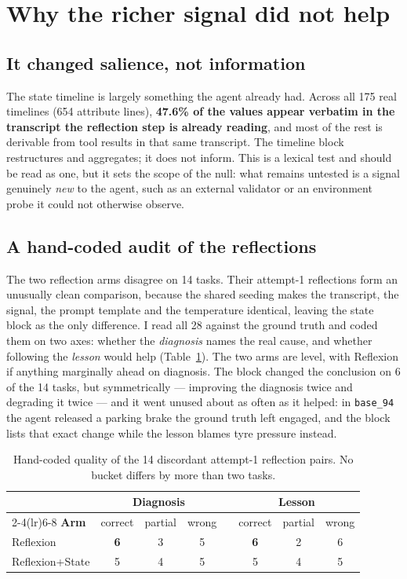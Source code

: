 \documentclass[a4paper, 12pt]{article}
\begin{document}
\section{Why the richer signal did not help}
\label{sec:why}

\subsection{It changed salience, not information}

The state timeline is largely something the agent already had. Across all 175 real
timelines (654 attribute lines), \textbf{47.6\% of the values appear verbatim in
the transcript the reflection step is already reading}, and most of the rest is
derivable from tool results in that same transcript. The timeline block restructures and
aggregates; it does not inform. This is a lexical test and should be read as
one, but it sets the scope of the null: what remains untested is a signal
genuinely \emph{new} to the agent, such as an external validator or an
environment probe it could not otherwise observe.

\subsection{A hand-coded audit of the reflections}

The two reflection arms disagree on 14 tasks. Their attempt-1 reflections form
an unusually clean comparison, because the shared seeding makes the transcript,
the signal, the prompt template and the temperature identical, leaving the state
block as the only difference. I read all 28 against the ground truth and coded
them on two axes: whether the \emph{diagnosis} names the real cause, and
whether following the \emph{lesson} would help (Table~\ref{tab:audit}).
The two arms are level, with Reflexion if anything marginally ahead on diagnosis.
The block changed the conclusion on 6 of the 14 tasks, but symmetrically ---
improving the diagnosis twice and degrading it twice --- and it went unused
about as often as it helped: in \texttt{base\_94} the agent released a parking
brake the ground truth left engaged, and the block lists that exact change while
the lesson blames tyre pressure instead.

\begin{table}[t]
\centering\footnotesize
\caption{Hand-coded quality of the 14 discordant attempt-1 reflection pairs. No
bucket differs by more than two tasks.}
\label{tab:audit}
\begin{tabular}{@{}lccc c ccc@{}}
\toprule
& \multicolumn{3}{c}{\textbf{Diagnosis}} & & \multicolumn{3}{c}{\textbf{Lesson}} \\
\cmidrule(lr){2-4}\cmidrule(lr){6-8}
\textbf{Arm} & correct & partial & wrong & & correct & partial & wrong \\
\midrule
Reflexion        & \textbf{6} & 3 & 5 & & \textbf{6} & 2 & 6 \\
Reflexion+State  & 5 & 4 & 5 & & 5 & 4 & 5 \\
\bottomrule
\end{tabular}
\end{table}
\end{document}
